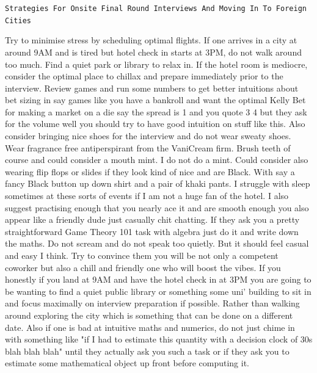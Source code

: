 \texttt{Strategies For Onsite Final Round Interviews And Moving In To Foreign Cities}

Try to minimise stress by scheduling optimal flights. If one arrives in a city at around 9AM and is tired but hotel check in starts at 3PM, do not walk around too much. Find a quiet park or library to relax in. If the hotel room is mediocre, consider the optimal place to chillax and prepare immediately prior to the interview. Review games and run some numbers to get better intuitions about bet sizing in say games like you have a bankroll and want the optimal Kelly Bet for making a market on a die say the spread is 1 and you quote 3 4 but they ask for the volume well you should try to have good intuition on stuff like this. Also consider bringing nice shoes for the interview and do not wear sweaty shoes. Wear fragrance free antiperspirant from the VaniCream firm. Brush teeth of course and could consider a mouth mint. I do not do a mint. Could consider also wearing flip flops or slides if they look kind of nice and are Black. With say a fancy Black button up down shirt and a pair of khaki pants. I struggle with sleep sometimes at these sorts of events if I am not a huge fan of the hotel. I also suggest practising enough that you nearly ace it and are smooth enough you also appear like a friendly dude just casually chit chatting. If they ask you a pretty straightforward Game Theory 101 task with algebra just do it and write down the maths. Do not scream and do not speak too quietly. But it should feel casual and easy I think. Try to convince them you will be not only a competent coworker but also a chill and friendly one who will boost the vibes. If you honestly if you land at 9AM and have the hotel check in at 3PM you are going to be wanting to find a quiet public library or something some uni' building to sit in and focus maximally on interview preparation if possible. Rather than walking around exploring the city which is something that can be done on a different date. Also if one is bad at intuitive maths and numerics, do not just chime in with something like "if I had to estimate this quantity with a decision clock of 30s blah blah blah" until they actually ask you such a task or if they ask you to estimate some mathematical object up front before computing it.

